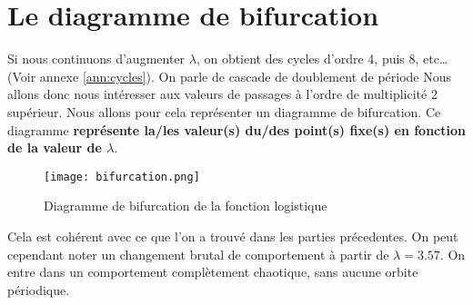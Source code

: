 \newpage
\section{Le diagramme de bifurcation}
Si nous continuons d'augmenter $\lambda$, on obtient des cycles d'ordre 4, puis 8, etc\dots (Voir annexe \ref{ann:cycles}). On parle de cascade de doublement de période
Nous allons donc nous intéresser aux valeurs de passages à l'ordre de multiplicité 2 supérieur. Nous allons pour cela représenter un diagramme de bifurcation. Ce diagramme \textbf{représente la/les valeur(s) du/des point(s) fixe(s) en fonction de la valeur de $\lambda$}.

\begin{figure}[!ht]
    \begin{center}
        \texttt{[image: bifurcation.png]}
    \end{center}
    \caption{\label{fig:bifurcation}Diagramme de bifurcation de la fonction logistique}
\end{figure}

Cela est cohérent avec ce que l'on a trouvé dans les parties précedentes. On peut cependant noter un changement brutal de comportement à partir de $\lambda = 3.57$. On entre dans un comportement complètement chaotique, sans aucune orbite périodique.
